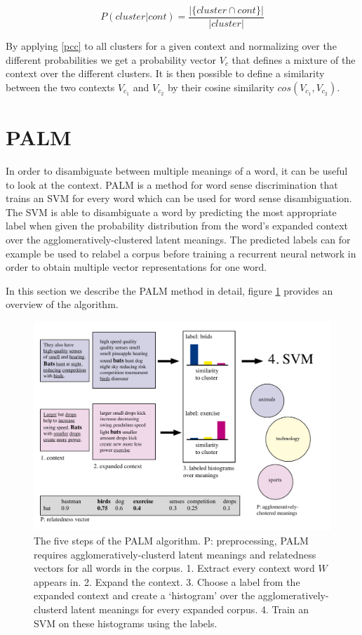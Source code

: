 \documentclass[11pt]{article}
\begin{document}
\begin{equation} \label{pcc}P( cluster | cont ) = \frac{ | \{cluster \cap cont\} |  }{| cluster |} \end{equation}

By applying \ref{pcc} to all clusters for a given context and normalizing over the different probabilities we get a probability vector $V_{c}$ that defines a mixture of the context over the different clusters. It is then possible to define a similarity between the two contexts $V_{c_1}$ and $V_{c_2}$ by their cosine similarity $cos(V_{c_1}, V_{c_2})$.

\section{PALM}
In order to disambiguate between multiple meanings of a word, it can be useful to look at the context. PALM is a method for word sense discrimination that trains an SVM for every word which can be used for word sense disambiguation. The SVM is able to disambiguate a word by predicting the most appropriate label when given the probability distribution from the word's expanded context over the agglomeratively-clustered latent meanings. The predicted labels can for example be used to relabel a corpus before training a recurrent neural network in order to obtain multiple vector representations for one word. 

In this section we describe the PALM method in detail, figure \ref{palmimg} provides an overview of the algorithm. 
\begin{figure}
\center
\includegraphics[scale=0.5]{images/palm.pdf}
\caption{The five steps of the PALM algorithm. P: preprocessing, PALM requires agglomeratively-clusterd latent meanings and relatedness vectors for all words in the corpus. 1. Extract every context word $W$ appears in. 2. Expand the context. 3. Choose a label from the expanded context and create a `histogram' over the agglomeratively-clusterd latent meanings for every expanded corpus. 4. Train an SVM on these histograms using the labels.}
\label{palmimg}
\end{figure}
\end{document}
